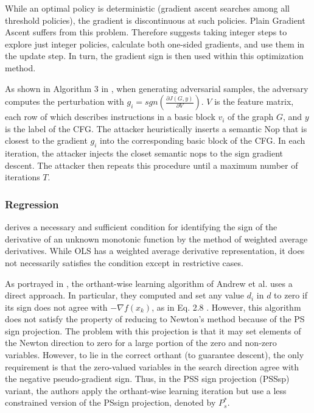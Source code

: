 \documentclass[11pt]{book}
\begin{document}
While an optimal policy is deterministic (gradient ascent searches
among all threshold policies), the gradient is discontinuous at such
policies. Plain Gradient Ascent suffers from this problem. Therefore
\cite{massaro2019optimal} suggests taking integer steps to explore
just integer policies, calculate both one-sided gradients, and use
them in the update step. In turn, the gradient sign is then used within
this optimization method.

As shown in Algorithm 3 in \cite{zhang2020semantic}, when generating
adversarial samples, the adversary computes the perturbation with
$g_{i}=sgn\left(\frac{\partial J\left(G,y\right)}{\partial V}\right)$.
$V$ is the feature matrix, each row of which describes instructions
in a basic block $v_{i}$ of the graph $G$, and $y$ is the label
of the CFG. The attacker heuristically inserts a semantic Nop that
is closest to the gradient $g_{i}$ into the corresponding basic block
of the CFG. In each iteration, the attacker injects the closet semantic
nops to the sign gradient descent. The attacker then repeats this
procedure until a maximum number of iterations $T$.

\subsubsection{Regression}

\cite{inoue2002identifying} derives a necessary and sufficient condition
for identifying the sign of the derivative of an unknown monotonic
function by the method of weighted average derivatives. While OLS
has a weighted average derivative representation, it does not necessarily
satisfies the condition except in restrictive cases.

As portrayed in \cite{schmidt2010graphical}, the orthant-wise learning
algorithm of Andrew et al. uses a direct approach. In particular,
they computed and set any value $d_{i}$ in $d$ to zero if its sign
does not agree with $-\nabla f(x_{k})$, as in Eq. 2.8 . However,
this algorithm does not satisfy the property of reducing to Newton's
method because of the PS sign projection. The problem with this projection
is that it may set elements of the Newton direction to zero for a
large portion of the zero and non-zero variables. However, to lie
in the correct orthant (to guarantee descent), the only requirement
is that the zero-valued variables in the search direction agree with
the negative pseudo-gradient sign. Thus, in the PSS sign projection
(PSSsp) variant, the authors apply the orthant-wise learning iteration
but use a less constrained version of the PSsign projection, denoted
by $P_{s}^{*}$.
\end{document}
